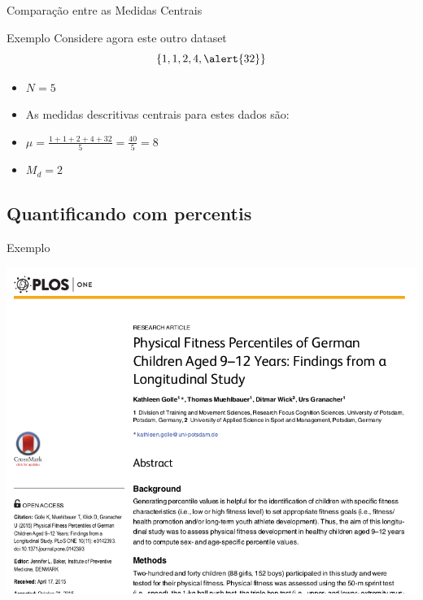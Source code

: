 \documentclass{beamer}
\begin{document}
\begin{frame}{\scriptsize Comparação entre as Medidas Centrais}
  \begin{exampleblock}{Exemplo}
    \footnotesize
    Considere agora este outro dataset $$\{
    1,1,2,4,\alert{32} \}$$
  \begin{itemize}
    \footnotesize
  \item $N=5$
  \item As medidas descritivas centrais para estes dados são:
  \item $\mu = \frac{1+1+2+4+32}{5} = \frac{40}{5}= 8$
  \item $M_d = 2$
  \end{itemize}
\end{exampleblock}
\end{frame}

\subsection{Quantificando com percentis}

\begin{frame}{\scriptsize Exemplo}
  \begin{center}
    \includegraphics[height=\textheight]{Cap3/percentil0}
  \end{center}
\end{frame}
\end{document}
